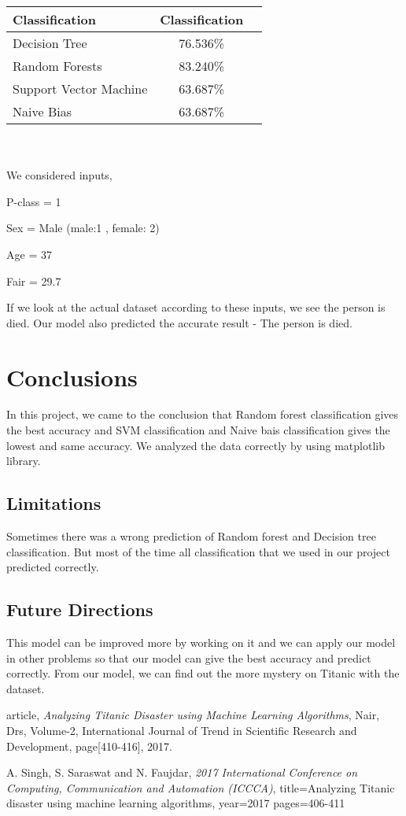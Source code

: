 \documentclass[11pt]{article} %
\begin{document}
\begin{tabular}{|l|c|r|}
    \hline
     Classification     &  Classification \\
    \hline
    Decision Tree & 76.536\%    \\
    \hline
    Random Forests   & 83.240\%   \\
    \hline
    Support Vector Machine    & 63.687\%    \\
    \hline
    Naive Bias   & 63.687\%   \\
    \hline
\end{tabular}
\\ \\
We considered inputs,

 P-class = 1
 
 Sex  = Male (male:1 , female: 2)
 
 Age = 37
 
 Fair = 29.7

If we look at the actual dataset according to these inputs, we see the person is died. Our model also predicted the accurate result - The person is died.


\section{Conclusions} %

In this project, we came to the conclusion that Random forest classification gives the best accuracy and SVM classification and Naive bais classification gives the lowest and same accuracy. We analyzed the data correctly by using matplotlib library.  

\subsection{Limitations}
Sometimes there was a wrong prediction of Random forest and Decision tree classification. But most of the time all classification that we used in our project predicted correctly.

\subsection{Future Directions}
This model can be improved more by working on it and we can apply our model in other problems so that our model can give the best accuracy and predict correctly. From our model, we can find out the more mystery on Titanic with the dataset. 


\begin{thebibliography}{9}

\bibitem{}
  article,
  \textit{Analyzing Titanic Disaster using Machine Learning Algorithms},
  Nair, Drs,
  Volume-2,
  International Journal of Trend in Scientific Research and Development,
  page[410-416],
  2017.
  
 \bibitem{}
 A. Singh, S. Saraswat and N. Faujdar,
 \textit{2017 International Conference on Computing, Communication and Automation (ICCCA)},
 title=Analyzing Titanic disaster using machine learning algorithms,
 year={2017}
 pages={406-411}

\end{thebibliography}
\end{document}
